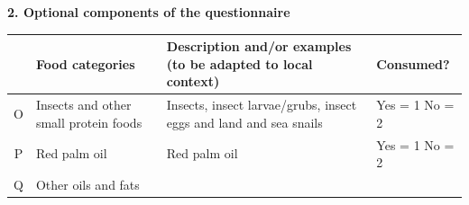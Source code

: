 \documentclass[12pt,]{book}
\theoremstyle{definition}
\theoremstyle{definition}
\theoremstyle{definition}
\theoremstyle{remark}
\begin{document}
\textbf{2. Optional components of the questionnaire}

\begin{longtable}[]{@{}clll@{}}
\toprule
\begin{minipage}[b]{0.05\columnwidth}\centering
\strut
\end{minipage} & \begin{minipage}[b]{0.18\columnwidth}\raggedright
\textbf{Food categories}\strut
\end{minipage} & \begin{minipage}[b]{0.54\columnwidth}\raggedright
\textbf{Description and/or examples (to be adapted to local
context)}\strut
\end{minipage} & \begin{minipage}[b]{0.12\columnwidth}\raggedright
\textbf{Consumed?}\strut
\end{minipage}\tabularnewline
\midrule
\endhead
\begin{minipage}[t]{0.05\columnwidth}\centering
O\strut
\end{minipage} & \begin{minipage}[t]{0.18\columnwidth}\raggedright
Insects and other small protein foods\strut
\end{minipage} & \begin{minipage}[t]{0.54\columnwidth}\raggedright
Insects, insect larvae/grubs, insect eggs and land and sea snails\strut
\end{minipage} & \begin{minipage}[t]{0.12\columnwidth}\raggedright
Yes = 1 No = 2\strut
\end{minipage}\tabularnewline
\begin{minipage}[t]{0.05\columnwidth}\centering
P\strut
\end{minipage} & \begin{minipage}[t]{0.18\columnwidth}\raggedright
Red palm oil\strut
\end{minipage} & \begin{minipage}[t]{0.54\columnwidth}\raggedright
Red palm oil\strut
\end{minipage} & \begin{minipage}[t]{0.12\columnwidth}\raggedright
Yes = 1 No = 2\strut
\end{minipage}\tabularnewline
\begin{minipage}[t]{0.05\columnwidth}\centering
Q\strut
\end{minipage} & \begin{minipage}[t]{0.18\columnwidth}\raggedright
Other oils and fats\strut

\end{minipage}
\end{longtable}
\end{document}
